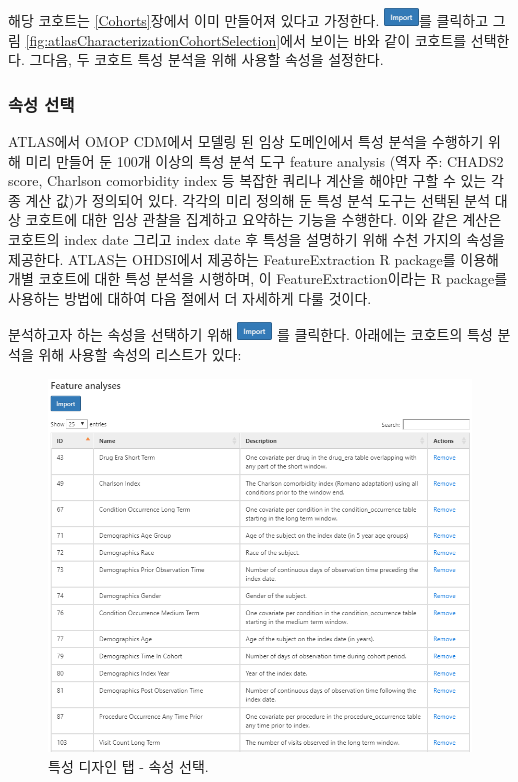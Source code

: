 \documentclass[10.5pt]{book}
\theoremstyle{definition}
\theoremstyle{definition}
\theoremstyle{definition}
\theoremstyle{remark}
\begin{document}
해당 코호트는 \ref{Cohorts}장에서 이미 만들어져 있다고 가정한다.
\includegraphics{images/Characterization/atlasImportButton.png}를
클릭하고 그림 \ref{fig:atlasCharacterizationCohortSelection}에서 보이는
바와 같이 코호트를 선택한다. 그다음, 두 코호트 특성 분석을 위해 사용할
속성을 설정한다.

\subsubsection*{속성 선택}\label{-}

ATLAS에서 OMOP CDM에서 모델링 된 임상 도메인에서 특성 분석을 수행하기
위해 미리 만들어 둔 100개 이상의 특성 분석 도구 feature analysis (역자
주: CHADS2 score, Charlson comorbidity index 등 복잡한 쿼리나 계산을
해야만 구할 수 있는 각종 계산 값)가 정의되어 있다. 각각의 미리 정의해 둔
특성 분석 도구는 선택된 분석 대상 코호트에 대한 임상 관찰을 집계하고
요약하는 기능을 수행한다. 이와 같은 계산은 코호트의 index date 그리고
index date 후 특성을 설명하기 위해 수천 가지의 속성을 제공한다. ATLAS는
OHDSI에서 제공하는 FeatureExtraction R package를 이용해 개별 코호트에
대한 특성 분석을 시행하며, 이 FeatureExtraction이라는 R package를
사용하는 방법에 대하여 다음 절에서 더 자세하게 다룰 것이다.

분석하고자 하는 속성을 선택하기 위해
\includegraphics{images/Characterization/atlasImportButton.png} 를
클릭한다. 아래에는 코호트의 특성 분석을 위해 사용할 속성의 리스트가
있다:

\begin{figure}

{\centering \includegraphics[width=1\linewidth]{images/Characterization/atlasCharacterizationFeatureSelection} 

}

\caption{특성 디자인 탭 - 속성 선택.}\label{fig:atlasCharacterizationFeatureSelection}
\end{figure}
\end{document}
